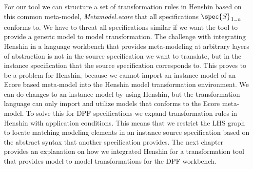 For our tool we can structure a set of transformation rules in Henshin based on 
this common meta-model, \textit{Metamodel.ecore} that all specifications
$\spec{S}$\textsubscript{1\ldots n} conforms to. We have to threat all
specifications similar if we want the tool to provide a generic model to model
transformation. The challenge with integrating Henshin in a language workbench
that provides meta-modeling at arbitrary layers of abstraction is not in the
source specification we want to translate, but in the instance specification
that the source specification corresponds to. This proves to be a problem for
Henshin, because we cannot import an instance model of an Ecore based meta-model
into the Henshin model transformation environment. We can do changes to an
instance model by using Henshin, but the transformation language can only
import and utilize models that conforms to the Ecore meta-model. To solve this
for DPF specifications we expand transformation rules in Henshin with
application conditions. This means that we restrict the LHS graph to locate
matching modeling elements in an instance source specification based on the
abstract syntax that another specification provides. The next chapter provides
an explanation on how we integrated Henshin for a transformation tool that
provides model to model transformations for the DPF workbench.






